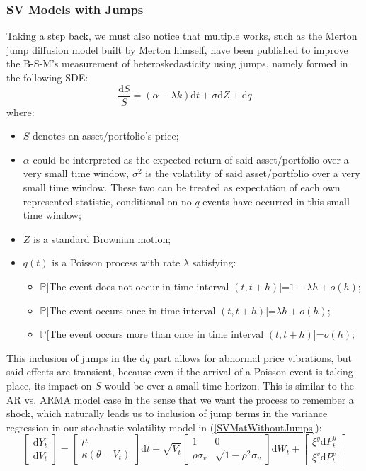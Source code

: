\documentclass[letterpaper]{article}
\newcommand{\df}{\mathrm{d}}
\newcommand{\prob}{\mathbb{P}}
\begin{document}
\subsubsection{SV Models with Jumps}
Taking a step back, we must also notice that multiple works, such as the Merton jump diffusion model built by Merton himself\cite{merton1976jumps}, have been published to improve the B-S-M's measurement of heteroskedasticity using jumps, namely formed in the following SDE:
\begin{equation}
	\frac{\df S}{S} = (\alpha-\lambda k)\df t+\sigma \df Z+\df q
\end{equation}
where:
\begin{itemize}
	\item $S$ denotes an asset/portfolio's price;
	\item $\alpha$ could be interpreted as the expected return of said asset/portfolio over a very small time window, $\sigma^2$ is the volatility of said asset/portfolio over a very small time window. These two can be treated as expectation of each own represented statistic, conditional on no $q$ events have occurred in this small time window;
	\item $Z$ is a standard Brownian motion;
	\item $q(t)$ is a Poisson process with rate $\lambda$ satisfying:
	\begin{itemize}
		\item $\prob$[The event does not occur in time interval $(t,t+h)$]=$1-\lambda h+o(h)$;
		\item $\prob$[The event occurs once in time interval $(t,t+h)$]=$\lambda h+o(h)$;
		\item $\prob$[The event occurs more than once in time interval $(t,t+h)$]=$o(h)$;
	\end{itemize}
\end{itemize}
This inclusion of jumps in the $\df q$ part allows for abnormal price vibrations, but said effects are transient, because even if the arrival of a Poisson event is taking place, its impact on $S$ would be over a small time horizon. This is similar to the AR vs. ARMA model case in the sense that we want the process to remember a shock, which naturally leads us to inclusion of jump terms in the variance regression in our stochastic volatility model in (\ref{SVMatWithoutJumps}):
\begin{equation}\label{SVMatWithJumps}
	\begin{bmatrix}
		\df Y_t\\
		\df V_t
	\end{bmatrix} = 
	\begin{bmatrix}
		\mu\\
		\kappa(\theta-V_t)
	\end{bmatrix}\df t+
	\sqrt{V_t}\begin{bmatrix}
		1 & 0 \\
		\rho\sigma_v &\sqrt{1-\rho^2}\sigma_v
	\end{bmatrix}\df W_t
	+\begin{bmatrix}
		\xi^y\df P_t^{y}\\
		\xi^v\df P_t^{v}
	\end{bmatrix}
\end{equation}
\end{document}
